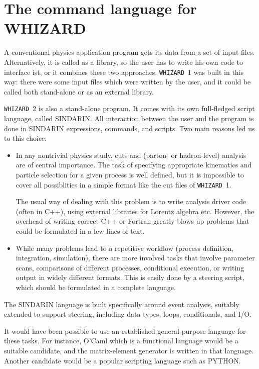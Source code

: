 \documentclass[12pt]{book}
\newcommand{\whizard}{\texttt{WHIZARD}}
\begin{document}
\section{The command language for WHIZARD}
A conventional physics application program gets its data from a set of input
files.  Alternatively, it is called as a library, so the user has to write his
own code to interface ist, or it combines these two approaches.  \whizard~1 was
built in this way: there were some input files which were written by the user,
and it could be called both stand-alone or as an external library.

\whizard~2 is also a stand-alone program.  It comes with its own full-fledged
script language, called SINDARIN.  All interaction between the user and the
program is done in SINDARIN expressions, commands, and scripts.  Two main
reasons led us to this choice:
\begin{itemize}
\item 
  In any nontrivial physics study, cuts and (parton- or hadron-level) analysis
  are of central importance.  The task of specifying appropriate kinematics
  and particle selection for a given process is well defined, but it is
  impossible to cover all possiblities in a simple format like the cut files
  of \whizard~1.

  The usual way of dealing with this problem is to write analysis driver code
  (often in C++), using external libraries for Lorentz algebra etc.  However,
  the overhead of writing correct C++ or Fortran greatly blows up problems
  that could be formulated in a few lines of text.
\item
  While many problems lead to a repetitive workflow (process definition,
  integration, simulation), there are more involved tasks that involve
  parameter scans, comparisons of different processes, conditional execution,
  or writing output in widely different formats.  This is easily done by a
  steering script, which should be formulated in a complete language.
\end{itemize}
The SINDARIN language is built specifically around event analysis, suitably
extended to support steering, including data types, loops, conditionals, and
I/O.  

It would have been possible to use an established general-purpose language for
these tasks.  For instance, O'Caml which is a functional language would be a
suitable candidate, and the matrix-element generator is written in that
language.  Another candidate would be a popular scripting language such as
PYTHON.
\end{document}

